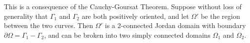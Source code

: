 \documentclass[10pt]{article}
\makeatletter
\theoremstyle{newstyle}
\newenvironment{pf}[1][\proofname]{\par
  \pushQED{\qed}%
  \normalfont \topsep0\p@\relax
  \trivlist
  \item[\hskip\labelsep\scshape
  #1\@addpunct{.}]\ignorespaces
}{%
  \popQED\endtrivlist\@endpefalse
}
\makeatother
\begin{document}
\begin{pf}
This is a consequence of the Cauchy-Goursat Theorem. Suppose without loss of generality 
that $\Gamma_1$ and $\Gamma_2$ are both positively oriented, and let 
$\Omega'$ be the region between the two curves. Then $\Omega'$ is a $2$-connected Jordan 
domain with boundary $\partial\Omega = \Gamma_1 - \Gamma_2$, and can be broken into two 
simply connected domains $\Omega_1$ and $\Omega_2$.

\begin{center}

\begin{tikzpicture}[x=0.75pt,y=0.75pt,yscale=-1,xscale=1]


\end{tikzpicture}
\end{center}
\end{pf}
\end{document}
